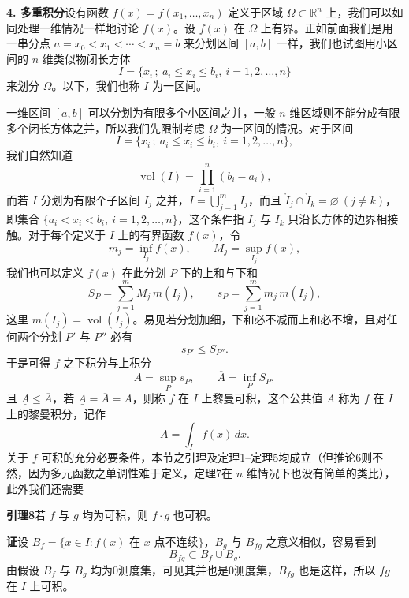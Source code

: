 \medskip
\noindent\textbf{4. 多重积分}\quad 设有函数 $f(x)=f(x_1,\ldots,x_n)$ 定义于区域 $\Omega\subset\mathbb R^n$ 上，我们可以如同处理一维情况一样地讨论 $f(x)$。设 $f(x)$ 在 $\Omega$ 上有界。正如前面我们是用一串分点 $a=x_0<x_1<\cdots<x_n=b$ 来分划区间 $[a,b]$ 一样，我们也试图用小区间的 $n$ 维类似物闭长方体
\[
 I=\{x_i\,;\ a_i\le x_i\le b_i,\ i=1,2,\ldots,n\}
\]
来划分 $\Omega$。以下，我们也称 $I$ 为一区间。

一维区间 $[a,b]$ 可以分划为有限多个小区间之并，一般 $n$ 维区域则不能分成有限多个闭长方体之并，所以我们先限制考虑 $\Omega$ 为一区间的情况。对于区间
\[
 I=\{x_i\,;\ a_i\le x_i\le b_i,\ i=1,2,\ldots,n\},
\]
我们自然知道
\[
 \operatorname{vol}(I)=\prod_{i=1}^{n}(b_i-a_i),
\]
而若 $I$ 分划为有限个子区间 $I_j$ 之并，$I=\bigcup_{j=1}^{m}I_j$，而且 $\mathring I_j\cap\mathring I_k=\varnothing\ (j\ne k)$，即集合 $\{a_i<x_i<b_i,\ i=1,2,\ldots,n\}$，这个条件指 $I_j$ 与 $I_k$ 只沿长方体的边界相接触。对于每个定义于 $I$ 上的有界函数 $f(x)$，令
\[
 m_j=\inf_{I_j}f(x),\qquad M_j=\sup_{I_j}f(x),
\]
我们也可以定义 $f(x)$ 在此分划 $P$ 下的上和与下和
\[
 S_P=\sum_{j=1}^{m}M_j\,m(I_j),\qquad
 s_P=\sum_{j=1}^{m}m_j\,m(I_j),
\]
这里 $m(I_j)=\operatorname{vol}(I_j)$。易见若分划加细，下和必不减而上和必不增，且对任何两个分划 $P'$ 与 $P''$ 必有
\[
 s_{P'}\le S_{P''}.
\]
于是可得 $f$ 之下积分与上积分
\[
 \underline A=\sup_P s_P,\qquad \overline A=\inf_P S_P,
\]
且 $\underline A\le\overline A$，若 $\underline A=\overline A=A$，则称 $f$ 在 $I$ 上黎曼可积，这个公共值 $A$ 称为 $f$ 在 $I$ 上的黎曼积分，记作
\[
 A=\int_I f(x)\,dx.
\]
关于 $f$ 可积的充分必要条件，本节之引理及定理1--定理5均成立（但推论6则不然，因为多元函数之单调性难于定义，定理7在 $n$ 维情况下也没有简单的类比），此外我们还需要

\noindent\textbf{引理8}\quad 若 $f$ 与 $g$ 均为可积，则 $f\cdot g$ 也可积。

\noindent\textbf{证}\quad 设 $B_f=\{x\in I:f(x)\text{ 在 }x\text{ 点不连续}\}$，$B_g$ 与 $B_{fg}$ 之意义相似，容易看到
\[
 B_{fg}\subset B_f\cup B_g.
\]
由假设 $B_f$ 与 $B_g$ 均为0测度集，可见其并也是0测度集，$B_{fg}$ 也是这样，所以 $fg$ 在 $I$ 上可积。

